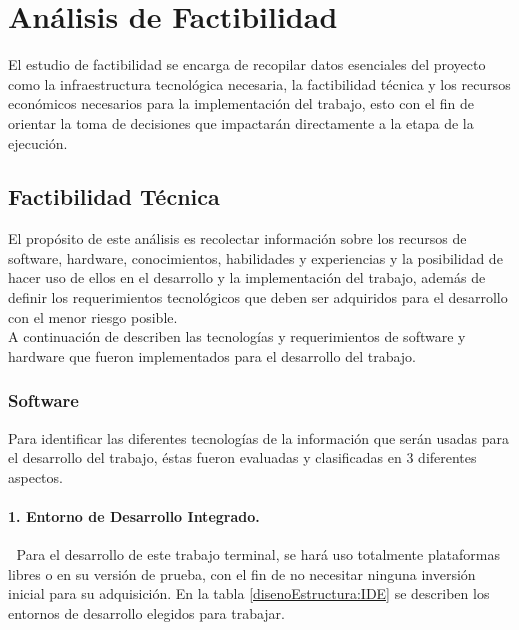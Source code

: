 \section{Análisis de Factibilidad}
El estudio de factibilidad se encarga de recopilar datos esenciales del proyecto como la infraestructura tecnológica necesaria, la factibilidad técnica y los recursos económicos necesarios para la implementación del trabajo, esto con el fin de orientar la toma de decisiones que impactarán directamente a la etapa de la ejecución.

\subsection{Factibilidad Técnica}
El propósito  de este análisis es recolectar información sobre los recursos de software, hardware, conocimientos, habilidades y experiencias y la posibilidad de hacer uso de ellos en el desarrollo y la implementación del trabajo, además de definir los requerimientos tecnológicos que deben ser adquiridos para el desarrollo con el menor riesgo posible.\\

A continuación de describen las tecnologías y requerimientos de software y hardware que fueron implementados para el desarrollo del trabajo.

\subsubsection{Software}
Para identificar las diferentes tecnologías de la información que serán usadas para el desarrollo del trabajo, éstas fueron evaluadas y clasificadas en 3 diferentes aspectos.

\paragraph{1. Entorno de Desarrollo Integrado.} \textcolor{White}{.} \newline
Para el desarrollo de este trabajo terminal, se hará uso totalmente plataformas libres o en su versión de prueba, con el fin de no necesitar ninguna inversión inicial para su adquisición. En la tabla \ref{disenoEstructura:IDE} se describen los entornos de desarrollo elegidos para trabajar.


